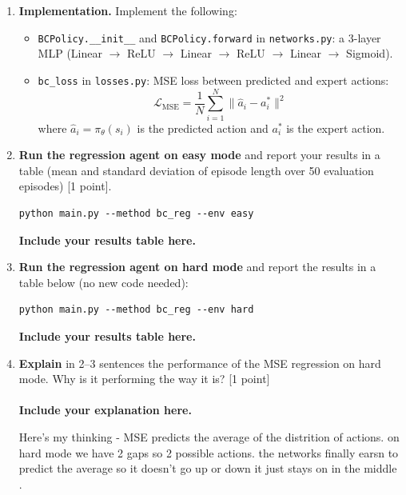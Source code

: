\documentclass[12pt]{article}
\begin{document}
\begin{enumerate}

\item \textbf{Implementation.} Implement the following:
\begin{itemize}
    \item \texttt{BCPolicy.\_\_init\_\_} and \texttt{BCPolicy.forward} in \texttt{networks.py}: a 3-layer MLP (Linear $\to$ ReLU $\to$ Linear $\to$ ReLU $\to$ Linear $\to$ Sigmoid).
    \item \texttt{bc\_loss} in \texttt{losses.py}: MSE loss between predicted and expert actions:
    \begin{equation}
        \mathcal{L}_{\text{MSE}} = \frac{1}{N} \sum_{i=1}^{N} \| \hat{a}_i - a_i^* \|^2
    \end{equation}
    where $\hat{a}_i = \pi_\theta(s_i)$ is the predicted action and $a_i^*$ is the expert action.
\end{itemize}

\item \textbf{Run the regression agent on easy mode} and report your results in a table (mean and standard deviation of episode length over 50 evaluation episodes) [1 point].

\begin{tcolorbox}[width=\linewidth, sharp corners=all, colback=white!95!black]
\begin{verbatim}
python main.py --method bc_reg --env easy
\end{verbatim}
\end{tcolorbox}

\textbf{\color{red}Include your results table here.}

\item \textbf{Run the regression agent on hard mode} and report the results in a table below (no new code needed):

\begin{tcolorbox}[width=\linewidth, sharp corners=all, colback=white!95!black]
\begin{verbatim}
python main.py --method bc_reg --env hard
\end{verbatim}
\end{tcolorbox}

\textbf{\color{red}Include your results table here.}


\item \textbf{Explain} in 2--3 sentences the performance of the MSE regression on hard mode. Why is it performing the way it is? [1 point]\\
\\
\textbf{\color{red}Include your explanation here.}

  Here's my thinking
  - MSE predicts the average of the distrition of actions. on hard mode we have 2 gaps so 2
      possible actions. the networks finally earsn to predict the average so it doesn't go up or down
      it just stays on in the middle .
\end{enumerate}
\end{document}
